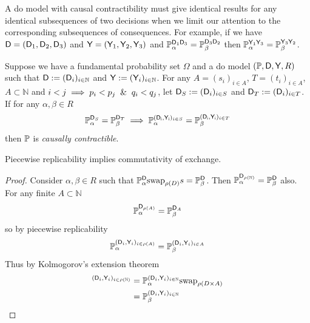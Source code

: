 A do model with causal contractibility must give identical results for any identical subsequences of two decisions when we limit our attention to the corresponding subsequences of consequences. For example, if we have $\mathsf{D}=(\mathsf{D}_1,\mathsf{D}_2,\mathsf{D}_3)$ and $\mathsf{Y}=(\mathsf{Y}_1,\mathsf{Y}_2,\mathsf{Y}_3)$ and $\mathbb{P}_\alpha^{\mathsf{D}_1\mathsf{D}_3}=\mathbb{P}_\beta^{\mathsf{D}_3\mathsf{D}_2}$ then $\mathbb{P}_{\alpha}^{\mathsf{Y}_1\mathsf{Y}_3}=\mathbb{P}_\beta^{\mathsf{Y}_3\mathsf{Y}_2}$.

\begin{definition}\label{def:caus_cont}
Suppose we have a fundamental probability set $\Omega$ and a do model $(\mathbb{P},\mathsf{D},\mathsf{Y},R)$ such that $\mathsf{D}:=(\mathsf{D}_i)_{i\in \mathbb{N}}$ and $\mathsf{Y}:=(\mathsf{Y}_i)_{i\in\mathbb{N}}$. For any $A=(s_i)_{i\in A}$, $T=(t_i)_{i\in A}$, $A\subset\mathbb{N}$ and $i<j\implies p_i<p_j \And q_i<q_j$, let $\mathsf{D}_S:=(\mathsf{D}_i)_{i\in S}$ and $\mathsf{D}_T:=(\mathsf{D}_i)_{i\in T}$. If for any $\alpha,\beta\in R$
\begin{align}
    \mathbb{P}_\alpha^{\mathsf{D}_{S}}=\mathbb{P}_\beta^{\mathsf{D}_{T}}\implies \mathbb{P}_\alpha^{(\mathsf{D_i,Y_i})_{i\in S}}=\mathbb{P}_\beta^{(\mathsf{D_i,Y_i})_{i\in T}}
\end{align}
then $\mathbb{P}$ is \emph{causally contractible}.
\end{definition}

\begin{theorem}
Piecewise replicability implies commutativity of exchange.
\end{theorem}

\begin{proof}
Consider $\alpha,\beta\in R$ such that $\mathbb{P}_\alpha^{\mathsf{D}}\text{swap}_{\rho(D)} s= \mathbb{P}_{\beta}^{\mathsf{D}}$. Then  $\mathbb{P}_\alpha^{\mathsf{D}_{\rho(\mathbb{N})}} = \mathbb{P}_{\beta}^{\mathsf{D}}$ also. For any finite $A\subset \mathbb{N}$
\begin{align}
    \mathbb{P}_\alpha^{\mathsf{D}_{\rho(A)}} = \mathbb{P}_{\beta}^{\mathsf{D}_A}
\end{align}
so by piecewise replicability
\begin{align}
    \mathbb{P}_\alpha^{(\mathsf{D}_i,\mathsf{Y}_i)_{i\in \rho(A)}} = \mathbb{P}_{\beta}^{(\mathsf{D}_i,\mathsf{Y}_i)_{i\in A}}
\end{align}
Thus by Kolmogorov's extension theorem
\begin{align}
    ^{(\mathsf{D}_i,\mathsf{Y}_i)_{i\in \rho(\mathbb{N})}} &= \mathbb{P}_\alpha^{(\mathsf{D}_i,\mathsf{Y}_i)_{i\in \mathbb{N}}}\text{swap}_{\rho(D\times A)}\\
                                         &= \mathbb{P}_{\beta}^{(\mathsf{D}_i,\mathsf{Y}_i)_{i\in \mathbb{N}}}
\end{align}
\end{proof}

